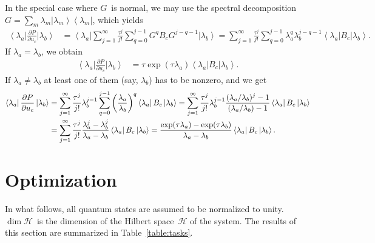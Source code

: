 \documentclass[aps, pra, a4paper, longbibliography, superscriptaddress]{revtex4-1}
\newcommand{\ket}[1]{\left| #1 \right \rangle}
\newcommand{\bra}[1]{\left \langle #1 \right|}
\newcommand{\hilb}[1]{\mathcal{#1}}
\newcommand{\dd}[2]{\frac{\partial #1}{\partial #2}}
\begin{document}
In the special case where $G$~is normal, we may use the spectral decomposition
$G = \sum_m \lambda_m \ket{\lambda_m} \bra{\lambda_m}$,
which yields
\begin{align}
\bra{\lambda_a} \dd{P}{u_{c}} \ket{\lambda_b}
&=
\bra{\lambda_a} \sum_{j=1}^{\infty} \frac{\tau^j}{j!} \sum_{q=0}^{j-1}
G^{q} B_c G^{j-q-1} \ket{\lambda_b}
=
\sum_{j=1}^{\infty} \frac{\tau^j}{j!} \sum_{q=0}^{j-1}
\lambda_a^{q} \lambda_b^{j-q-1} \bra{\lambda_a} B_c \ket{\lambda_b}.
\end{align}
If $\lambda_a = \lambda_b$, we obtain
\begin{align}
\bra{\lambda_a} \dd{P}{u_{c}} \ket{\lambda_b}
&=
\tau \exp(\tau \lambda_a) \bra{\lambda_a} B_c \ket{\lambda_b}.
\end{align}
If $\lambda_a \neq \lambda_b$ at least one of them (say, $\lambda_b$) has to be nonzero,
and we get
\begin{align}
\notag
\bra{\lambda_a} \dd{P}{u_{c}} \ket{\lambda_b}
&=
\sum_{j=1}^{\infty} \frac{\tau^j}{j!} \lambda_b^{j-1}
\sum_{q=0}^{j-1} \left(\frac{\lambda_a}{\lambda_b}\right)^{q}  \bra{\lambda_a} B_c \ket{\lambda_b}
=
\sum_{j=1}^{\infty} \frac{\tau^j}{j!} \lambda_b^{j-1}
\frac{(\lambda_a/\lambda_b)^j -1}{(\lambda_a/\lambda_b) -1}  \bra{\lambda_a} B_c \ket{\lambda_b}\\
&=
\sum_{j=1}^{\infty} \frac{\tau^j}{j!} 
\frac{\lambda_a^j -\lambda_b^j}{\lambda_a -\lambda_b}  \bra{\lambda_a} B_c \ket{\lambda_b}
=
\frac{\exp(\tau \lambda_a) -\exp(\tau \lambda_b)}{\lambda_a -\lambda_b}  \bra{\lambda_a} B_c \ket{\lambda_b}.
\end{align}










\section{Optimization}

In what follows, all quantum states are assumed to be normalized to
unity. $\dim \hilb{H}$~is the dimension of the Hilbert space~$\hilb{H}$ of the system.
The results of this section are summarized in Table~\ref{table:tasks}.
\end{document}
